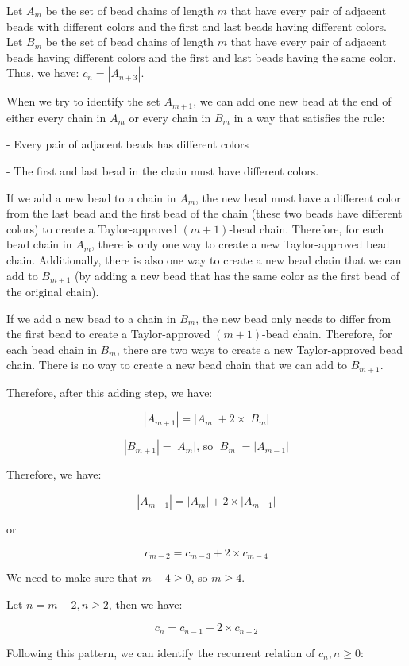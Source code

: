 \documentclass[10pt]{article}
\begin{document}
\begin{enumerate}
\begin{enumerate}
Let $A_m$ be the set of bead chains of length $m$ that have every pair of adjacent beads with different colors and the first and last beads having different colors. Let $B_m$ be the set of bead chains of length $m$ that have every pair of adjacent beads having different colors and the first and last beads having the same color. Thus, we have: $c_n=|A_{n+3}|$. 

When we try to identify the set $A_{m+1}$, we can add one new bead at the end of either every chain in $A_m$ or every chain in $B_m$ in a way that satisfies the rule:

- Every pair of adjacent beads has different colors

- The first and last bead in the chain must have different colors.

If we add a new bead to a chain in $A_m$, the new bead must have a different color from the last bead and the first bead of the chain (these two beads have different colors) to create a Taylor-approved $(m+1)$-bead chain. Therefore, for each bead chain in $A_m$, there is only one way to create a new Taylor-approved bead chain. Additionally, there is also one way to create a new bead chain that we can add to $B_{m+1}$ (by adding a new bead that has the same color as the first bead of the original chain).

If we add a new bead to a chain in $B_m$, the new bead only needs to differ from the first bead to create a Taylor-approved $(m+1)$-bead chain. Therefore, for each bead chain in $B_m$, there are two ways to create a new Taylor-approved bead chain. There is no way to create a new bead chain that we can add to $B_{m+1}$.

Therefore, after this adding step, we have:

$$|A_{m+1}|=|A_m|+2\times|B_m|$$

$$|B_{m+1}|=|A_m| \text{, so }  |B_{m}|=|A_{m-1}|$$

Therefore, we have:

$$|A_{m+1}|=|A_m|+2\times|A_{m-1}|$$

or 

$$c_{m-2}=c_{m-3}+2\times c_{m-4}$$

We need to make sure that $m-4 \geq 0$, so $m \geq 4$.

Let $n=m-2, n \geq 2$, then we have:

$$c_{n}=c_{n-1}+2\times c_{n-2}$$

Following this pattern, we can identify the recurrent relation of $c_n, n \geq 0$:


\end{enumerate}
\end{enumerate}
\end{document}
